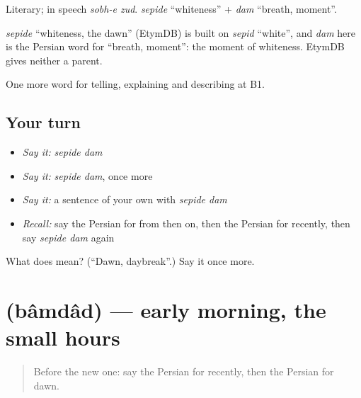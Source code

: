 Literary; in speech \emph{sobh-e zud}. \emph{sepide} \textquotedblleft{}whiteness\textquotedblright{} + \emph{dam} \textquotedblleft{}breath, moment\textquotedblright{}.

\begin{cousinweb}
\emph{sepide} \textquotedblleft{}whiteness, the dawn\textquotedblright{} (EtymDB) is built on \emph{sepid} \textquotedblleft{}white\textquotedblright{}, and \emph{dam} here is the Persian word for \textquotedblleft{}breath, moment\textquotedblright{}: the moment of whiteness. EtymDB gives neither a parent.
\end{cousinweb}

\begin{grammarlens}[title={What you've built}]
One more word for telling, explaining and describing at B1.
\end{grammarlens}

\subsection*{Your turn}
\begin{itemize}
\raggedright
  \item \emph{Say it:} \emph{sepide dam}
  \item \emph{Say it:} \emph{sepide dam}, once more
  \item \emph{Say it:} a sentence of your own with \emph{sepide dam}
  \item \emph{Recall:} say the Persian for from then on, then the Persian for recently, then say \emph{sepide dam} again
\end{itemize}

\begin{tcolorbox}[breakable,colback=teal!4,colframe=teal!35!black,title={Before you move on}]
What does   mean? (\textquotedblleft{}Dawn, daybreak\textquotedblright{}.) Say it once more.
\end{tcolorbox}
\section[\texorpdfstring{\fa{بامداد} (bâmdâd)}{بامداد (bâmdâd)}]{ (bâmdâd) — early morning, the small hours}

\label{lesson:FA-C305-bamdad}



\begin{quote}
Before the new one: say the Persian for recently, then the Persian for dawn.
\end{quote}

